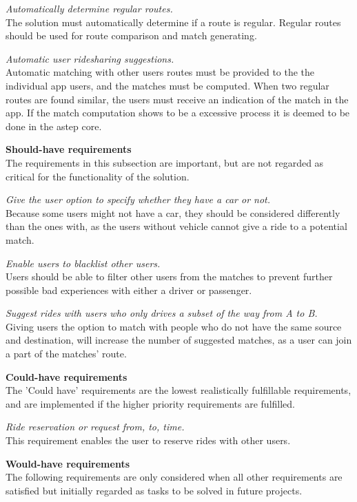 \textit{Automatically determine regular routes.}\\
The solution must automatically determine if a route is regular. 
Regular routes should be used for route comparison and match generating. 

\textit{Automatic user ridesharing suggestions.}\\
Automatic matching with other users routes must be provided to the the individual app users, and the matches must be computed.
When two regular routes are found similar, the users must receive an indication of the match in the app.
If the match computation shows to be a excessive process it is deemed to be done in the \gls{astep} core.


\textbf{Should-have requirements}\\
The requirements in this subsection are important, but are not regarded as critical for the functionality of the solution.

\textit{Give the user option to specify whether they have a car or not.}\\
Because some users might not have a car, they should be considered differently than the ones with, as the users without vehicle cannot give a ride to a potential match.

\textit{Enable users to blacklist other users.}\\
Users should be able to filter other users from the matches to prevent further possible bad experiences with either a driver or passenger.

\textit{Suggest rides with users who only drives a subset of the way from A to B.}\\
Giving users the option to match with people who do not have the same source and destination, will increase the number of suggested matches, as a user can join a part of the matches' route.


\textbf{Could-have requirements}\\
The 'Could have' requirements are the lowest realistically fulfillable requirements, and are implemented if the higher priority requirements are fulfilled.

\textit{Ride reservation or request from, to, time.}\\
This requirement enables the user to reserve rides with other users. 

\textbf{Would-have requirements}\\
The following requirements are only considered when all other requirements are satisfied but initially regarded as tasks to be solved in future projects.

